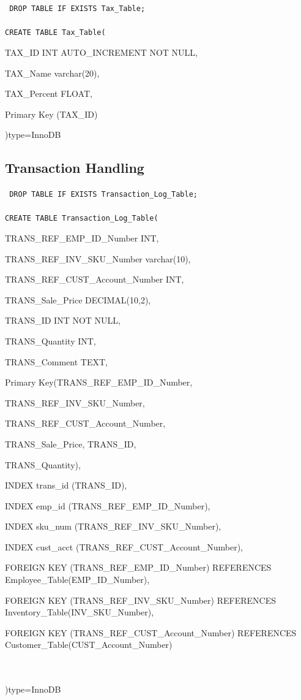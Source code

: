 \documentclass{report}
\begin{document}
	{\tt\small
	DROP TABLE IF EXISTS Tax\_Table;\\
	\\
	CREATE TABLE Tax\_Table(
	\begin{list}{}
		\item{TAX\_ID          INT AUTO\_INCREMENT NOT NULL,}
		\item{TAX\_Name        varchar(20),}
		\item{TAX\_Percent     FLOAT,}
		\item{Primary Key (TAX\_ID)}
	\end{list}
	)type=InnoDB\\
	}


    \subsection{Transaction Handling}

    	{\tt\small
	DROP TABLE IF EXISTS Transaction\_Log\_Table;\\
	\\
	CREATE TABLE Transaction\_Log\_Table(
	\begin{list}{}
		\item{TRANS\_REF\_EMP\_ID\_Number                 INT,}
		\item{TRANS\_REF\_INV\_SKU\_Number                varchar(10),}
		\item{TRANS\_REF\_CUST\_Account\_Number           INT,}
		\item{TRANS\_Sale\_Price                        DECIMAL(10,2),}
		\item{TRANS\_ID                                INT NOT NULL,}
		\item{TRANS\_Quantity                          INT,}
		\item{TRANS\_Comment                           TEXT,}
		\item{Primary Key(TRANS\_REF\_EMP\_ID\_Number,}
		\begin{list}{}
			\item{TRANS\_REF\_INV\_SKU\_Number,}
			\item{TRANS\_REF\_CUST\_Account\_Number,}
			\item{TRANS\_Sale\_Price, TRANS\_ID,}
			\item{TRANS\_Quantity),}
		\end{list}
		\item{INDEX trans\_id (TRANS\_ID),}
		\item{INDEX emp\_id (TRANS\_REF\_EMP\_ID\_Number),}
		\item{INDEX sku\_num (TRANS\_REF\_INV\_SKU\_Number),}
		\item{INDEX cust\_acct (TRANS\_REF\_CUST\_Account\_Number),}
		\item{FOREIGN KEY (TRANS\_REF\_EMP\_ID\_Number) REFERENCES Employee\_Table(EMP\_ID\_Number),}
		\item{FOREIGN KEY (TRANS\_REF\_INV\_SKU\_Number) REFERENCES Inventory\_Table(INV\_SKU\_Number),}
		\item{FOREIGN KEY (TRANS\_REF\_CUST\_Account\_Number) REFERENCES Customer\_Table(CUST\_Account\_Number)}
	\end{list}\\
	\\
	)type=InnoDB
	}
\end{document}
